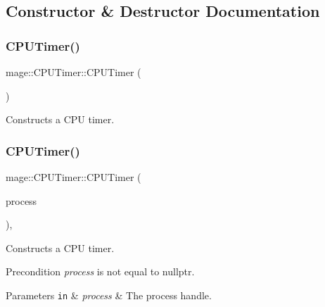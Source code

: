 \subsection{Constructor \& Destructor Documentation}
\hypertarget{classmage_1_1_c_p_u_timer_a52f2c0bdd6377df54363ff775a6ec430}{}\label{classmage_1_1_c_p_u_timer_a52f2c0bdd6377df54363ff775a6ec430} 
\subsubsection{\texorpdfstring{C\+P\+U\+Timer()}{CPUTimer()}\hspace{0.1cm}{\footnotesize\ttfamily [1/4]}}
{\footnotesize\ttfamily mage\+::\+C\+P\+U\+Timer\+::\+C\+P\+U\+Timer (\begin{DoxyParamCaption}{ }\end{DoxyParamCaption})\hspace{0.3cm}{\ttfamily [noexcept]}}

Constructs a C\+PU timer. \hypertarget{classmage_1_1_c_p_u_timer_ae85f321f737770034cff1fd9e9ef13c4}{}\label{classmage_1_1_c_p_u_timer_ae85f321f737770034cff1fd9e9ef13c4} 
\subsubsection{\texorpdfstring{C\+P\+U\+Timer()}{CPUTimer()}\hspace{0.1cm}{\footnotesize\ttfamily [2/4]}}
{\footnotesize\ttfamily mage\+::\+C\+P\+U\+Timer\+::\+C\+P\+U\+Timer (\begin{DoxyParamCaption}\item[{H\+A\+N\+D\+LE}]{process }\end{DoxyParamCaption})\hspace{0.3cm}{\ttfamily [explicit]}, {\ttfamily [noexcept]}}

Constructs a C\+PU timer.

\begin{DoxyPrecond}{Precondition}
{\itshape process} is not equal to {\ttfamily nullptr}. 
\end{DoxyPrecond}

\begin{DoxyParams}[1]{Parameters}
\mbox{\tt in}  & {\em process} & The process handle. \\
\hline
\end{DoxyParams}
\hypertarget{classmage_1_1_c_p_u_timer_a23afe7d7b5d85ecf1275f750a935e7c3}{}\label{classmage_1_1_c_p_u_timer_a23afe7d7b5d85ecf1275f750a935e7c3} 
